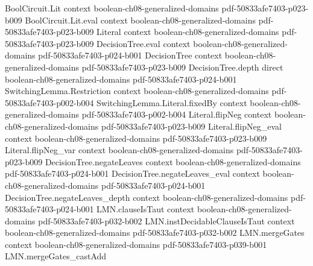 \begin{theorem}
\label{BooleanAnalysis.totalInfluence_eq_sum_sq_deg}
\leanok
{}
\proofstep
  {BoolCircuit.Lit}
  {context}
  {boolean-ch08-generalized-domains}
  {pdf-50833afe7403-p023-b009}
\proofstep
  {BoolCircuit.Lit.eval}
  {context}
  {boolean-ch08-generalized-domains}
  {pdf-50833afe7403-p023-b009}
\proofstep
  {Literal}
  {context}
  {boolean-ch08-generalized-domains}
  {pdf-50833afe7403-p023-b009}
\proofstep
  {DecisionTree.eval}
  {context}
  {boolean-ch08-generalized-domains}
  {pdf-50833afe7403-p024-b001}
\proofstep
  {DecisionTree}
  {context}
  {boolean-ch08-generalized-domains}
  {pdf-50833afe7403-p023-b009}
\proofstep
  {DecisionTree.depth}
  {direct}
  {boolean-ch08-generalized-domains}
  {pdf-50833afe7403-p024-b001}
\proofstep
  {SwitchingLemma.Restriction}
  {context}
  {boolean-ch08-generalized-domains}
  {pdf-50833afe7403-p002-b004}
\proofstep
  {SwitchingLemma.Literal.fixedBy}
  {context}
  {boolean-ch08-generalized-domains}
  {pdf-50833afe7403-p002-b004}
\proofstep
  {Literal.flipNeg}
  {context}
  {boolean-ch08-generalized-domains}
  {pdf-50833afe7403-p023-b009}
\proofstep
  {Literal.flipNeg_eval}
  {context}
  {boolean-ch08-generalized-domains}
  {pdf-50833afe7403-p023-b009}
\proofstep
  {Literal.flipNeg_var}
  {context}
  {boolean-ch08-generalized-domains}
  {pdf-50833afe7403-p023-b009}
\proofstep
  {DecisionTree.negateLeaves}
  {context}
  {boolean-ch08-generalized-domains}
  {pdf-50833afe7403-p024-b001}
\proofstep
  {DecisionTree.negateLeaves_eval}
  {context}
  {boolean-ch08-generalized-domains}
  {pdf-50833afe7403-p024-b001}
\proofstep
  {DecisionTree.negateLeaves_depth}
  {context}
  {boolean-ch08-generalized-domains}
  {pdf-50833afe7403-p024-b001}
\proofstep
  {LMN.clauseIsTaut}
  {context}
  {boolean-ch08-generalized-domains}
  {pdf-50833afe7403-p032-b002}
\proofstep
  {LMN.instDecidableClauseIsTaut}
  {context}
  {boolean-ch08-generalized-domains}
  {pdf-50833afe7403-p032-b002}
\proofstep
  {LMN.mergeGates}
  {context}
  {boolean-ch08-generalized-domains}
  {pdf-50833afe7403-p039-b001}
\proofstep
  {LMN.mergeGates_castAdd}

\end{theorem}
